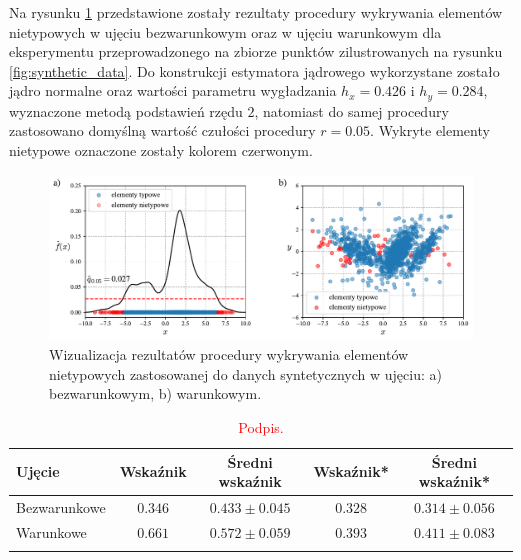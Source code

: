 \documentclass[12pt,a4paper,oneside]{book}
\theoremstyle{definition}
\begin{document}
Na rysunku \ref{fig:synthetic_data_outliers} przedstawione zostały rezultaty procedury wykrywania elementów nietypowych w ujęciu bezwarunkowym oraz w ujęciu warunkowym dla eksperymentu przeprowadzonego na zbiorze punktów zilustrowanych na rysunku \ref{fig:synthetic_data}. Do konstrukcji estymatora jądrowego wykorzystane zostało jądro normalne oraz wartości parametru wygładzania $h_x=0.426$ i $h_y=0.284$, wyznaczone metodą podstawień rzędu $2$, natomiast do samej procedury zastosowano domyślną wartość czułości procedury $r=0.05$. Wykryte elementy nietypowe oznaczone zostały kolorem czerwonym.
\begin{figure}[H]
    \centering
    \includegraphics[scale=0.6]{synthetic_data_outliers_kde_and_ckde}
    \vspace{-0.5cm} 
    \caption{Wizualizacja rezultatów procedury wykrywania elementów nietypowych zastosowanej do danych syntetycznych w ujęciu: a) bezwarunkowym, b) warunkowym.}
    \label{fig:synthetic_data_outliers}
\end{figure}
\begin{table}[H]
\caption{\textcolor{red}{Podpis.}}
\centering
\begin{tabular}{ lcccc }
\toprule
\textbf{Ujęcie} & \textbf{Wskaźnik} & \textbf{Średni wskaźnik} & \textbf{Wskaźnik*} & \textbf{Średni wskaźnik*} \\ 
\toprule
\addlinespace[0.2cm]
Bezwarunkowe & $0.346$ & $0.433 \pm 0.045$ & $0.328$ & $0.314 \pm 0.056$ \\
\addlinespace[0.2cm]
Warunkowe & $0.661$ & $0.572 \pm 0.059$ & $0.393$ & $0.411 \pm 0.083$ \\
\addlinespace[0.1cm]
\bottomrule
\end{tabular}
\label{table:synthetic_data_outliers}
\end{table}
\end{document}
